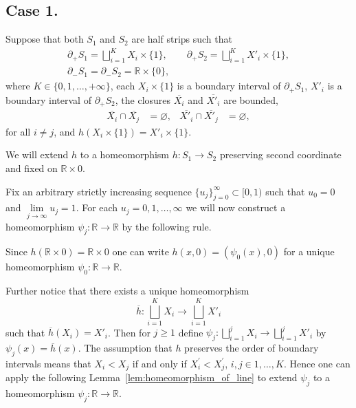 \documentclass[12pt, reqno]{amsart}
\newcommand{\bR}{\mathbb{R}}
\newcommand\dif{h}
\newcommand{\strip}{S}
\newcommand{\bdX}{X}
\newcommand{\leveld}[1]{u_{#1}}
\begin{document}
\subsection*{Case 1.} 
Suppose that both $\strip_1$ and $\strip_2$ are half strips such that
\begin{gather*}
\partial_{+} \strip_1 = \bigsqcup_{i=1}^{K} \bdX_{i}  \times \{1\}, 
\qquad 
\partial_{+} \strip_2 = \bigsqcup_{i=1}^{K} \bdX'_{i}  \times \{1\}, \\
\partial_{-} \strip_1=\partial_{-} \strip_2=\bR\times\{0\},
\end{gather*}
where $K \in \{0,1,\ldots, +\infty\}$, each $\bdX_{i}\times\{1\}$ is a boundary interval of $\partial_{+}\strip_1$, $\bdX'_{i}$ is a boundary interval of $\partial_{+}\strip_2$, the closures $\overline{\bdX_{i}}$ and $\overline{\bdX'_{i}}$ are bounded, 
\begin{align}\label{equ:case1:half_strips_disjoint_closures}
\overline{\bdX_{i}} \cap \overline{\bdX_{j}} &= \varnothing, &
\overline{\bdX'_{i}} \cap \overline{\bdX'_{j}} &= \varnothing,
\end{align}
for all $i\not= j$, and $\dif(\bdX_{i}\times\{1\}) = \bdX'_{i}\times\{1\}$.

We will extend $\dif$ to a homeomorphism $\dif: \strip_1 \to \strip_2$ preserving second coordinate and fixed on $\bR\times 0$.


Fix an arbitrary strictly increasing sequence $\{\leveld{j}\}^{\infty}_{j=0} \subset [0,1)$ such that $\leveld{0} = 0$ and $\lim\limits_{j\to\infty} \leveld{j} = 1$.
For each $\leveld{j}=0,1,\ldots,\infty$ we will now construct a homeomorphism $\psi_j: \bR \rightarrow \bR$ by the following rule.

Since $\dif(\bR\times0) = \bR\times0$ one can write $\dif(x,0) = (\psi_0(x),0)$ for a unique homeomorphism $\psi_0:\bR\to\bR$.

Further notice that there exists a unique homeomorphism 
\[\overline{h}: \bigsqcup\limits_{i=1}^{K} \bdX_i \to \bigsqcup\limits_{i=1}^{K} \bdX'_i\]
such that 
$\overline{h}(\bdX_{i}) = \bdX'_{i}$.
Then for $j\geq1$ define $\psi_j: \bigsqcup\limits_{i=1}^{j} X_i \to \bigsqcup\limits_{i=1}^{j} X'_i$ by $\psi_j(x) = \overline{h}(x)$.
The assumption that $\dif$ preserves the order of boundary intervals means that $\bdX_i < \bdX_j$ if and only if $\bdX^{'}_i < \bdX^{'}_j$, $i,j \in 1,\ldots, K$.
Hence one can apply the following Lemma~\ref{lem:homeomorphism_of_line} to extend $\psi_j$ to a homeomorphism $\psi_j: \bR \rightarrow \bR$.
\end{document}
